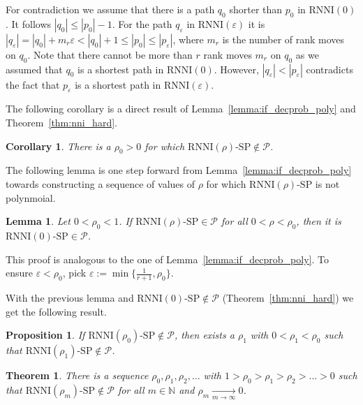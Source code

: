 \documentclass[11pt]{amsart}
\newtheorem{proposition}{Proposition}
\newtheorem{theorem}{Theorem}
\newtheorem{lemma}{Lemma}
\newtheorem{corollary}{Corollary}
\newcommand{\rnni}{\mathrm{RNNI}}
\newcommand{\p}{\mathcal{P}}
\newcommand{\decprob}[1]{\rnni(#1)\text{-}\mathrm{SP}}
\renewcommand{\epsilon}{\varepsilon}
\newcommand{\summary}[1]{} %
\begin{document}
    For contradiction we assume that there is a path $q_0$ shorter than $p_0$ in $\rnni(0)$.
    It follows $|q_0| \leq |p_0| - 1$.
    For the path $q_\epsilon$ in $\rnni(\epsilon)$ it is $|q_\epsilon| = |q_0| + m_r \epsilon < |q_0| + 1 \leq |p_0| \leq |p_\epsilon|$, where $m_r$ is the number of rank moves on $q_0$.
    Note that there cannot be more than $r$ rank moves $m_r$ on $q_0$ as we assumed that $q_0$ is a shortest path in $\rnni(0)$.
    However, $|q_\epsilon| < |p_\epsilon|$ contradicts the fact that $p_\epsilon$ is a shortest path in $\rnni(\epsilon)$.
\endproof

The following corollary is a direct result of Lemma~\ref{lemma:if_decprob_poly} and Theorem~\ref{thm:nni_hard}.

\begin{corollary}
    There is a $\rho_0 > 0$ for which $\decprob{\rho} \notin \p$.
    \label{cor:exists_rho_not_poly}
\end{corollary}

\summary{Finding a sequence of $\rho$s converging to zero for which the problem is not in $\p$.}

The following lemma is one step forward from Lemma~\ref{lemma:if_decprob_poly} towards constructing a sequence of values of $\rho$ for which $\decprob{\rho}$ is not polynmoial.

\begin{lemma}
    Let $0 < \rho_0 < 1$.
    If $\decprob{\rho} \in \p$ for all $0<\rho<\rho_0$, then it is ${\decprob{0} \in \p}$.
\end{lemma}

\proof
	This proof is analogous to the one of Lemma~\ref{lemma:if_decprob_poly}.
	To ensure $\epsilon < \rho_0$, pick $\epsilon := \min\{\frac{1}{r + 1}, \rho_0\}$.
\endproof

With the previous lemma and $\decprob{0} \notin \p$ (Theorem~\ref{thm:nni_hard}) we get the following result.

\begin{proposition}
    If $\decprob{\rho_0} \notin \p$, then exists a $\rho_1$ with $0 < \rho_1 < \rho_0$ such that ${\decprob{\rho_1} \notin \p}$.
    \label{proposition:more_rho_not_poly}
\end{proposition}

\begin{theorem}
    There is a sequence $\rho_0, \rho_1, \rho_2, \ldots$ with $1 > \rho_0 > \rho_1 > \rho_2 > \ldots > 0$ such that $\decprob{\rho_m} \notin \p$ for all $m \in \mathbb N$ and $\rho_m \underset{m \rightarrow \infty}{\longrightarrow} 0$.
\end{theorem}
\end{document}
